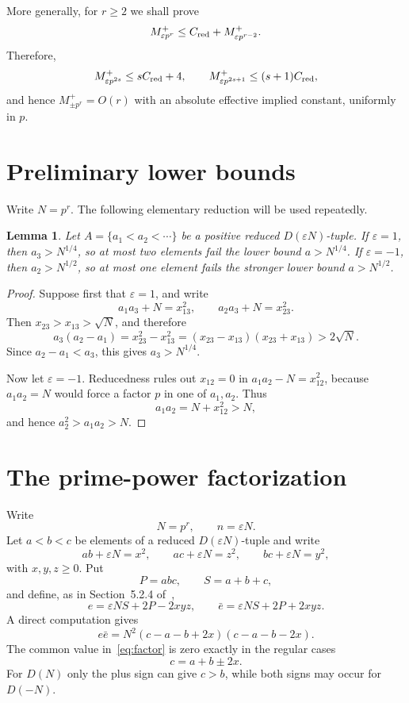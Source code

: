 \documentclass[11pt]{amsart}
\newtheorem{lemma}[theorem]{Lemma}
\theoremstyle{remark}
\newcommand{\eps}{\varepsilon}
\begin{document}
More generally, for $r\ge2$ we shall prove
\begin{equation}\label{eq:recursion-intro}
 M_{\eps p^r}^+\le C_{\rm red}+M_{\eps p^{r-2}}^+.
\end{equation}
Therefore, 
\[
 M_{\eps p^{2s}}^+\le sC_{\rm red}+4,
 \qquad
 M_{\eps p^{2s+1}}^+\le (s+1)C_{\rm red},
\]
and hence $M_{\pm p^r}^+=O(r)$ with an absolute effective implied constant,
uniformly in $p$.

\section{Preliminary lower bounds}

Write $N=p^r$. The following elementary reduction will be used repeatedly.

\begin{lemma}%
\label{lem:lower}
Let $A=\{a_1<a_2<\cdots\}$ be a positive reduced $D(\eps N)$-tuple.
If $\eps=1$, then $a_3>N^{1/4}$, so at most two elements fail the lower
bound $a>N^{1/4}$. If $\eps=-1$, then $a_2>N^{1/2}$, so at most one
element fails the stronger lower bound $a>N^{1/2}$.
\end{lemma}

\begin{proof}
Suppose first that $\eps=1$, and write
\[
 a_1a_3+N=x_{13}^2,\qquad a_2a_3+N=x_{23}^2.
\]
Then $x_{23}>x_{13}>\sqrt N$, and therefore
\[
 a_3(a_2-a_1)=x_{23}^2-x_{13}^2
 =(x_{23}-x_{13})(x_{23}+x_{13})>2\sqrt N.
\]
Since $a_2-a_1<a_3$, this gives $a_3>N^{1/4}$.

Now let $\eps=-1$. Reducedness rules out $x_{12}=0$ in
$a_1a_2-N=x_{12}^2$, because $a_1a_2=N$ would force a factor $p$ in one
of $a_1,a_2$. Thus
\[
 a_1a_2=N+x_{12}^2>N,
\]
and hence $a_2^2>a_1a_2>N$.
\end{proof}

\section{The prime-power factorization}

Write
\[
 N=p^r,\qquad n=\eps N.
\]
Let $a<b<c$ be elements of a reduced $D(\eps N)$-tuple and write
\[
 ab+\eps N=x^2,\qquad ac+\eps N=z^2,\qquad bc+\eps N=y^2,
\]
with $x,y,z\ge0$.  Put
\[
 P=abc,\qquad S=a+b+c,
\]
and define, as in Section~5.2.4 of~\cite{Dbook},
\begin{equation}
 e=\eps NS+2P-2xyz,
 \qquad
 \bar e=\eps NS+2P+2xyz.
\end{equation}
A direct computation gives
\begin{equation}\label{eq:factor}
 e\bar e
 =N^2(c-a-b+2x)(c-a-b-2x).
\end{equation}
The common value in~\eqref{eq:factor} is zero exactly in the regular cases
\begin{equation}
 c=a+b\pm2x.
\end{equation}
For $D(N)$ only the plus sign can give $c>b$, while both signs may occur for
$D(-N)$.
\end{document}
